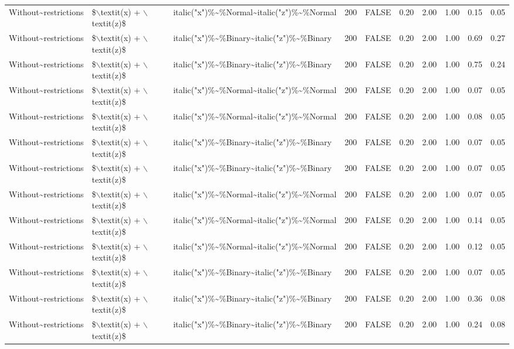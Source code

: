 \begin{longtable}{lllrlrrrrr}
  Without\~{}restrictions & \$$\backslash$textit(x) + $\backslash$textit(z)\$ & italic("x")\%\~{}\%Normal\~{}italic("z")\%\~{}\%Normal & 200 & FALSE & 0.20 & 2.00 & 1.00 & 0.15 & 0.05 \\ 
  Without\~{}restrictions & \$$\backslash$textit(x) + $\backslash$textit(z)\$ & italic("x")\%\~{}\%Binary\~{}italic("z")\%\~{}\%Binary & 200 & FALSE & 0.20 & 2.00 & 1.00 & 0.69 & 0.27 \\ 
  Without\~{}restrictions & \$$\backslash$textit(x) + $\backslash$textit(z)\$ & italic("x")\%\~{}\%Binary\~{}italic("z")\%\~{}\%Binary & 200 & FALSE & 0.20 & 2.00 & 1.00 & 0.75 & 0.24 \\ 
  Without\~{}restrictions & \$$\backslash$textit(x) + $\backslash$textit(z)\$ & italic("x")\%\~{}\%Normal\~{}italic("z")\%\~{}\%Normal & 200 & FALSE & 0.20 & 2.00 & 1.00 & 0.07 & 0.05 \\ 
  Without\~{}restrictions & \$$\backslash$textit(x) + $\backslash$textit(z)\$ & italic("x")\%\~{}\%Normal\~{}italic("z")\%\~{}\%Normal & 200 & FALSE & 0.20 & 2.00 & 1.00 & 0.08 & 0.05 \\ 
  Without\~{}restrictions & \$$\backslash$textit(x) + $\backslash$textit(z)\$ & italic("x")\%\~{}\%Binary\~{}italic("z")\%\~{}\%Binary & 200 & FALSE & 0.20 & 2.00 & 1.00 & 0.07 & 0.05 \\ 
  Without\~{}restrictions & \$$\backslash$textit(x) + $\backslash$textit(z)\$ & italic("x")\%\~{}\%Binary\~{}italic("z")\%\~{}\%Binary & 200 & FALSE & 0.20 & 2.00 & 1.00 & 0.07 & 0.05 \\ 
  Without\~{}restrictions & \$$\backslash$textit(x) + $\backslash$textit(z)\$ & italic("x")\%\~{}\%Normal\~{}italic("z")\%\~{}\%Normal & 200 & FALSE & 0.20 & 2.00 & 1.00 & 0.07 & 0.05 \\ 
  Without\~{}restrictions & \$$\backslash$textit(x) + $\backslash$textit(z)\$ & italic("x")\%\~{}\%Normal\~{}italic("z")\%\~{}\%Normal & 200 & FALSE & 0.20 & 2.00 & 1.00 & 0.14 & 0.05 \\ 
  Without\~{}restrictions & \$$\backslash$textit(x) + $\backslash$textit(z)\$ & italic("x")\%\~{}\%Normal\~{}italic("z")\%\~{}\%Normal & 200 & FALSE & 0.20 & 2.00 & 1.00 & 0.12 & 0.05 \\ 
  Without\~{}restrictions & \$$\backslash$textit(x) + $\backslash$textit(z)\$ & italic("x")\%\~{}\%Binary\~{}italic("z")\%\~{}\%Binary & 200 & FALSE & 0.20 & 2.00 & 1.00 & 0.07 & 0.05 \\ 
  Without\~{}restrictions & \$$\backslash$textit(x) + $\backslash$textit(z)\$ & italic("x")\%\~{}\%Binary\~{}italic("z")\%\~{}\%Binary & 200 & FALSE & 0.20 & 2.00 & 1.00 & 0.36 & 0.08 \\ 
  Without\~{}restrictions & \$$\backslash$textit(x) + $\backslash$textit(z)\$ & italic("x")\%\~{}\%Binary\~{}italic("z")\%\~{}\%Binary & 200 & FALSE & 0.20 & 2.00 & 1.00 & 0.24 & 0.08 \\ 
   \hline
\hline
\end{longtable}
